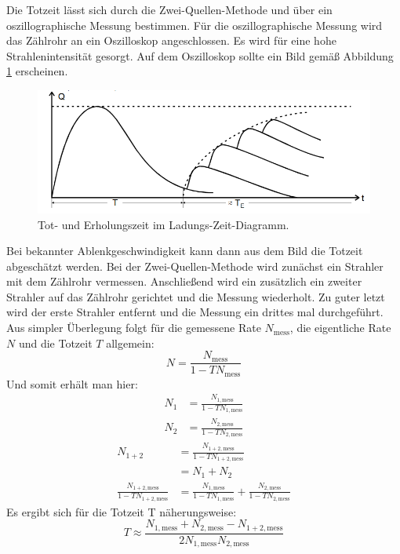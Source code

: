 Die Totzeit lässt sich durch die Zwei-Quellen-Methode und über ein oszillographische Messung bestimmen.
Für die oszillographische Messung wird das Zählrohr an ein Oszilloskop angeschlossen.
Es wird für eine hohe Strahlenintensität gesorgt.
Auf dem Oszilloskop sollte ein Bild gemäß Abbildung \ref{fig:osz} erscheinen.
\begin{figure}[H]
  \centering
  \includegraphics[width=\textwidth]{content/Totzeit.png}
  \caption{Tot- und Erholungszeit im Ladungs-Zeit-Diagramm.\cite{v703}}
  \label{fig:osz}
\end{figure}

Bei bekannter Ablenkgeschwindigkeit kann dann aus dem Bild die Totzeit abgeschätzt werden.
Bei der Zwei-Quellen-Methode wird zunächst ein Strahler mit dem Zählrohr vermessen. Anschließend wird ein zusätzlich ein zweiter Strahler
auf das Zählrohr gerichtet und die Messung wiederholt.
Zu guter letzt wird der erste Strahler entfernt und die Messung ein drittes mal durchgeführt.
Aus simpler Überlegung folgt für die gemessene Rate $N_\text{mess}$, die eigentliche Rate $N$ und die Totzeit $T$ allgemein:
\begin{equation}
    N = \frac{N_\text{mess}}{1-TN_\text{mess}}
\end{equation}
Und somit erhält man hier:
\begin{align}
    N_1     &= \frac{N_{1,\text{mess}}}{1-TN_{1,\text{mess}}} \\
    N_2     &= \frac{N_{2,\text{mess}}}{1-TN_{2,\text{mess}}}
\end{align}
\begin{align}
    N_{1+2} &= \frac{N_{1+2,\text{mess}}}{1-TN_{1+2,\text{mess}}} \\
            &= N_1 + N_2 \\
    \frac{N_{1+2,\text{mess}}}{1-TN_{1+2,\text{mess}}} &=\frac{N_{1,\text{mess}}}{1-TN_{1,\text{mess}}} + \frac{N_{2,\text{mess}}}{1-TN_{2,\text{mess}}}
\end{align}
Es ergibt sich für die Totzeit T näherungsweise:
\begin{equation}
    \label{eqn:totzeit}
    T \approx \frac{N_{1,\text{mess}} + N_{2,\text{mess}} - N_{1+2,\text{mess}}}{2N_{1,\text{mess}}N_{2,\text{mess}}}
\end{equation}

